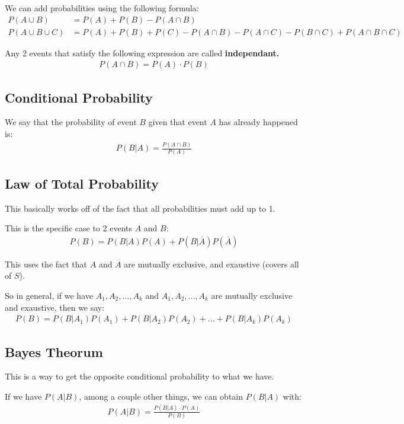\documentclass[12pt,letterpaper]{article} \usepackage{amsmath} \usepackage{graphicx} \usepackage[margin=1in]{geometry} \usepackage{longtable}  \usepackage{amssymb}
\begin{document}
	We can add probabilities using the following formula:
	\begin{align*}
		P(A\cup B) &= P(A) + P(B) - P(A\cap B) \\
		P(A\cup B \cup C) &= P(A)+P(B)+P(C)-P(A\cap B) - P(A\cap C) - P(B\cap C) + P(A\cap B\cap C)
	\end{align*}

	Any 2 events that satisfy the following expression are called \textbf{independant. }
	\begin{align*}
		P(A\cap B) = P(A)\cdot P(B)
	\end{align*}

	\subsection{Conditional Probability}
	We say that the probability of event $B$ given that event $A$ has already happened is:
	\begin{align*}
		P(B|A) = \frac{P(A\cap B)}{P(A)}
	\end{align*}
	
	\subsection{Law of Total Probability}
	This basically works off of the fact that all probabilities must add up to 1. 
	
	This is the specific case to 2 events $A$ and $B$:
	\begin{align*}
		P(B) = P(B|A)P(A) + P(B|\overline A)P(\overline A)
	\end{align*}

	This uses the fact that $A$ and $\overline A$ are mutually exclusive, and exaustive (covers all of $S$). 
	
	So in general, if we have $A_1, A_2, ..., A_k$ and $A_1, A_2, ..., A_k$ are mutually exclusive and exaustive, then we say:
	\begin{align*}
		P(B) = P(B|A_1)P(A_1) + P(B|A_2)P(A_2) + ... + P(B|A_k)P(A_k)
	\end{align*}
	
	\subsection{Bayes Theorum}
	This is a way to get the opposite conditional probability to what we have. 
	
	If we have $P(A|B)$, among a couple other things, we can obtain $P(B|A)$ with:
	\begin{align*}
		P(A|B) = \frac{P(B|A)\cdot P(A)}{P(B)}
	\end{align*}
	
\end{document}

